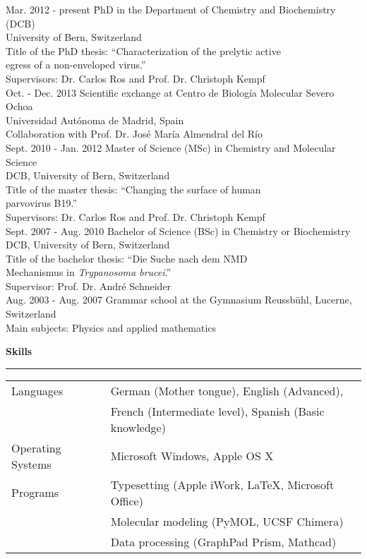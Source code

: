 \normalsize
\vspace{-0.7cm}
\begin{tabbing}
Mar. 2012 - present \hspace*{0.9cm} \= PhD in the Department of Chemistry and Biochemistry (DCB) \\ 
\> University of Bern, Switzerland  \\
\> Title of the PhD thesis: ``Characterization of the prelytic active \\ 
\> egress of a non-enveloped virus.'' \\
\> Supervisors: Dr. Carlos Ros and Prof. Dr. Christoph Kempf \\ [0.3cm]
Oct. - Dec. 2013 \> Scientific exchange at Centro de Biología Molecular Severo Ochoa \\
\> Universidad Autónoma de Madrid, Spain \\
\> Collaboration with Prof. Dr. José María Almendral del Río \\ [0.3cm]
Sept. 2010 - Jan. 2012 \> Master of Science (MSc) in Chemistry and Molecular Science \\
\> DCB, University of Bern, Switzerland  \\
\> Title of the master thesis: ``Changing the surface of human \\ \> parvovirus B19.'' \\
\> Supervisors: Dr. Carlos Ros and Prof. Dr. Christoph Kempf \\ [0.3cm]
Sept. 2007 - Aug. 2010 \> Bachelor of Science (BSc) in Chemistry or Biochemistry \\
\> DCB, University of Bern, Switzerland  \\
\> Title of the bachelor thesis: ``Die Suche nach dem NMD \\
\> Mechanismus in \textit{Trypanosoma brucei}.'' \\
\> Supervisor: Prof. Dr. André Schneider \\ [0.3cm]
Aug. 2003 - Aug. 2007 \> Grammar school at the Gymnasium Reussbühl, Lucerne, Switzerland \\
\> Main subjects: Physics and applied mathematics

\end{tabbing}

\clearpage
\vspace{-8 cm}
\large
\textbf{Skills}
\noindent\rule[3mm]{\linewidth}{1pt}

\normalsize
\vspace{-0.2cm}
\begin{tabular}{p{4cm} l}
Languages & German (Mother tongue), English (Advanced), \\ 
& French (Intermediate level), Spanish (Basic knowledge) \\ [0.15 cm]
Operating Systems & Microsoft Windows, Apple OS X \\ [0.15cm]
Programs & Typesetting (Apple iWork, \LaTeX, Microsoft Office) \\
& Molecular modeling (PyMOL, UCSF Chimera)\\
& Data processing (GraphPad Prism, Mathcad)
\end{tabular}

